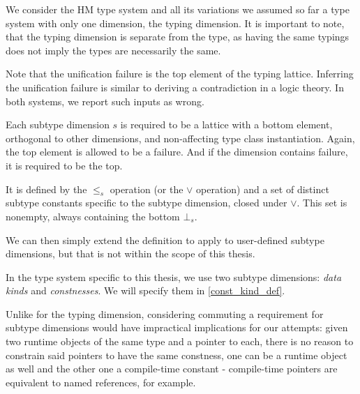 \begin{remark}
    We consider the HM type system and all its variations we assumed so far a type system with only one dimension, the typing dimension. It is important to note, that the typing dimension is separate from the type, as having the same typings does not imply the types are necessarily the same.
\end{remark}

\begin{remark}
    Note that the unification failure is the top element of the typing lattice. Inferring the unification failure is similar to deriving a contradiction in a logic theory. In both systems, we report such inputs as wrong.
\end{remark}

\begin{defn}
    \label{st_dim}
    Each subtype dimension $s$ is required to be a lattice with a bottom element, orthogonal to other dimensions, and non-affecting type class instantiation. Again, the top element is allowed to be a failure. And if the dimension contains failure, it is required to be the top.

    It is defined by the $\leq_s$ operation (or the $\lor$ operation) and a set of distinct subtype constants specific to the subtype dimension, closed under $\lor$. This set is nonempty, always containing the bottom $\bot_s$.

    We can then simply extend the definition to apply to user-defined subtype dimensions, but that is not within the scope of this thesis.

    In the type system specific to this thesis, we use two subtype dimensions: \emph{data kinds} and \emph{constnesses}. We will specify them in \cref{const_kind_def}.
\end{defn}

\begin{remark}
    \label{congruence}
    Unlike for the typing dimension, considering commuting a requirement for subtype dimensions would have impractical implications for our attempts: given two runtime objects of the same type and a pointer to each, there is no reason to constrain said pointers to have the same constness, one can be a runtime object as well and the other one a compile-time constant - compile-time pointers are equivalent to named references, for example.
\end{remark}


